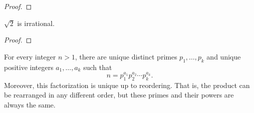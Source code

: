 \documentclass[11pt,a4paper]{article}
\begin{document}
\begin{proof}
    
\end{proof}

\begin{prop}
    \(\sqrt{2}\) is irrational.
\end{prop}

\begin{proof}
    
\end{proof}


\begin{teo}
   For every integer $n>1$, there are unique distinct primes $p_1, \ldots, p_k $ and unique positive integers $a_1, \ldots, a_k $ such that
\[
n=p_1^{a_1} p_2^{a_2} \cdots p_k^{a_k}.
\] 
Moreover, this factorization is unique up to reordering. That is, the product  can be rearranged in any  different order, but these primes and their powers are always the same.
\end{teo}
\end{document}

